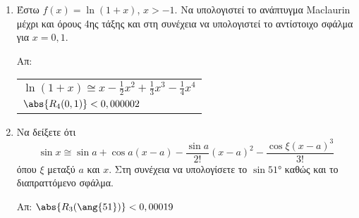 \begin{enumerate}
    \item Έστω $ f(x) = \ln{(1+x)} $, $ x>-1 $. Να υπολογιστεί το ανάπτυγμα
      Maclaurin μέχρι και όρους 4ης τάξης και στη συνέχεια να
      υπολογιστεί το αντίστοιχο σφάλμα για $ x = 0,1 $.

      \hfill Απ: \begin{tabular}{l}
        $ \ln(1+x) \cong x - \frac{1}{2} x^{2} + \frac{1}{3}x^{3} - 
        \frac{1}{4} x^{4} $ \\
        $ \abs{R_{4}(0,1)} < 0,000002$	
      \end{tabular}

    \item Να δείξετε ότι 
      \[
        \sin{x} \cong \sin{a} + \cos{a} (x-a) - \frac{\sin{a}}{2!} (x-a)^{2} -
        \frac{\cos{\xi} (x-a)^{3}}{3!}
      \]
      όπου $\xi$ μεταξύ $a$ και $x$. Στη συνέχεια να υπολογίσετε το $
      \sin{\ang{51}}$ καθώς και το διαπραττόμενο σφάλμα.

      \hfill Απ: $ \abs{R_{3}(\ang{51})} < 0,00019 $
  \end{enumerate}


  
